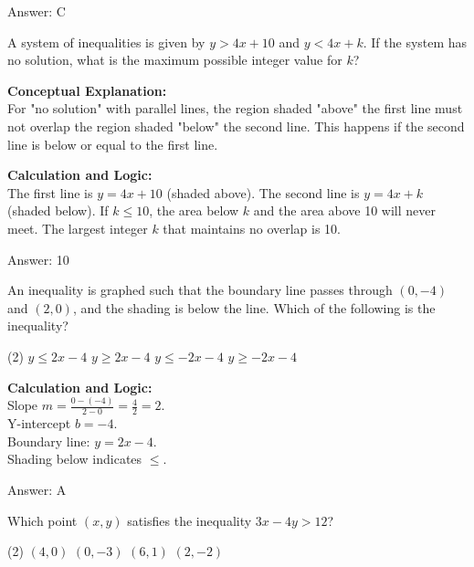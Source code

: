 \documentclass[11pt,paper=a4,answers]{exam}
\begin{document}
\begin{questions}
\begin{solution}
\vspace{15pt}
Answer: \colorbox{yellow!100}{C}
\end{solution}

\question
A system of inequalities is given by $y > 4x + 10$ and $y < 4x + k$. If the system has no solution, what is the maximum possible integer value for $k$?

\begin{solution}
\textbf{Conceptual Explanation:} \\
For "no solution" with parallel lines, the region shaded "above" the first line must not overlap the region shaded "below" the second line. This happens if the second line is below or equal to the first line.

\vspace{10pt}
\textbf{Calculation and Logic:} \\
The first line is $y = 4x + 10$ (shaded above). 
The second line is $y = 4x + k$ (shaded below). 
If $k \le 10$, the area below $k$ and the area above 10 will never meet. 
The largest integer $k$ that maintains no overlap is 10.

\vspace{15pt}
Answer: \colorbox{yellow!100}{10}
\end{solution}

\question
An inequality is graphed such that the boundary line passes through $(0, -4)$ and $(2, 0)$, and the shading is below the line. Which of the following is the inequality?
\begin{tasks}(2)
    \task $y \le 2x - 4$
    \task $y \ge 2x - 4$
    \task $y \le -2x - 4$
    \task $y \ge -2x - 4$
\end{tasks}

\begin{solution}
\textbf{Calculation and Logic:} \\
Slope $m = \frac{0 - (-4)}{2 - 0} = \frac{4}{2} = 2$. \\
Y-intercept $b = -4$. \\
Boundary line: $y = 2x - 4$. \\
Shading below indicates $\le$.

\vspace{15pt}
Answer: \colorbox{yellow!100}{A}
\end{solution}

\question
Which point $(x, y)$ satisfies the inequality $3x - 4y > 12$?
\begin{tasks}(2)
    \task $(4, 0)$
    \task $(0, -3)$
    \task $(6, 1)$
    \task $(2, -2)$
\end{tasks}


\end{questions}
\end{document}
